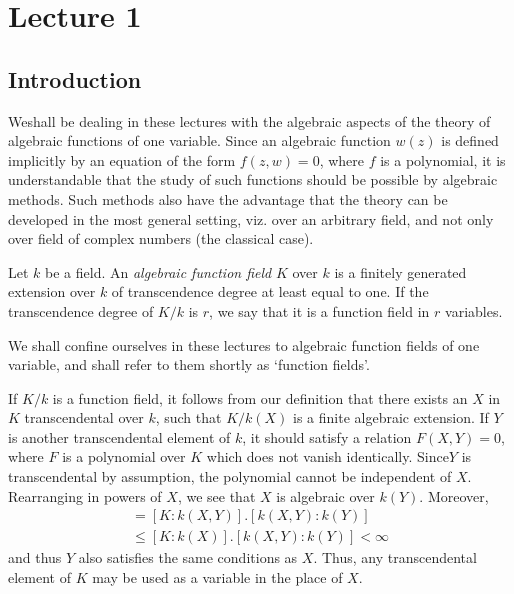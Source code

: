 \chapter{Lecture 1}\label{chap1}

\section{Introduction}\label{chap1:sec1}

We\pageoriginale shall be dealing in these lectures with the algebraic aspects of
the theory of algebraic functions of one variable. Since an algebraic
function $w(z)$ is defined implicitly by an equation of the form $f(z,
w) = 0$, where $f$ is a polynomial, it is understandable that the
study of such functions should be possible by algebraic methods. Such
methods also have the advantage that the theory can be developed in
the most general setting, viz. over an arbitrary field, and not only
over field of complex numbers (the classical case). 

\begin{defi*}
  Let $k$ be a field. An {\em algebraic function field} $K$ over $k$
  is a finitely generated extension over $k$ of transcendence degree
  at least equal to one. If the transcendence degree of $K/k$ is $r$,
  we say that it is a function field in $r$ variables. 
\end{defi*}

We shall confine ourselves in these lectures to algebraic function
fields of one variable, and shall refer to them shortly as `function
fields'. 

If $K/k$ is a function field, it follows from our definition that
there exists an $X$ in $K$ transcendental over $k$, such that $K/k(X)$
is a finite algebraic extension. If $Y$ is another transcendental
element of $k$, it should satisfy a relation $F(X, Y) = 0$, where $F$
is a polynomial over $K$ which does not vanish identically. Since\pageoriginale $Y$
is transcendental by assumption, the polynomial cannot be independent
of $X$. Rearranging in powers of $X$, we see that $X$ is algebraic
over $k(Y)$. Moreover, 
\begin{multline*}
  [K : k(Y)] = [K  : k(X,Y)]. [k(X, Y): k(Y)]\\ 
  \le [K : k(X)] . [k (X,  Y): k(Y)] < \infty  
\end{multline*}
and thus $Y$ also satisfies the same conditions as $X$. Thus, any
transcendental element of $K$ may be used as a variable in the place
of $X$. 

